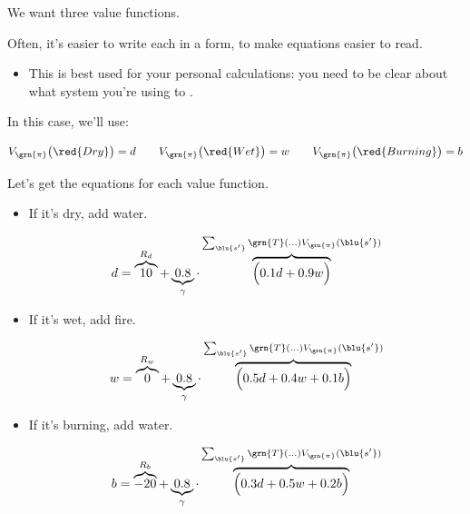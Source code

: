         We want three value functions.\\

        \begin{notation}
            Often, it's easier to write each  in a  form, to make equations easier to read.

            \begin{itemize}
                \item This is best used for your personal calculations: you need to be clear about what system you're using to .
            \end{itemize}

            In this case, we'll use:

            \begin{equation*}
                V_{\grn{\pi}}\big(\red{Dry}\big) = d 
                \qquad
                V_{\grn{\pi}}\big(\red{Wet}\big) = w
                \qquad
                V_{\grn{\pi}}\big(\red{Burning}\big) = b
            \end{equation*}
        \end{notation}

        Let's get the equations for each value function.

        \begin{itemize}
            \item If it's dry, add water.
        

        \begin{equation}
            d = 
            \overbrace{10}^{R_d} + 
            \underbrace{0.8}_{\gamma} \cdot 
            \overbrace{
            \Big(
                0.1 d + 
                0.9 w
            \Big)
            }^{\sum_{\blu{s'}}  
                \grn{T}(...)
                V_{\grn{\pi}}(\blu{s'} )}
        \end{equation}
        
        \item If it's wet, add fire.
        
        \begin{equation}
            w = 
            \overbrace{0}^{R_w} + 
            \underbrace{0.8}_{\gamma} \cdot 
            \overbrace{
            \Big(
                0.5d + 0.4w + 0.1b
            \Big)
            }^{\sum_{\blu{s'}}  
                \grn{T}(...)
                V_{\grn{\pi}}(\blu{s'} )}
        \end{equation}

        \item If it's burning, add water.

        \begin{equation}
            b = 
            \overbrace{-20}^{R_b} + 
            \underbrace{0.8}_{\gamma} \cdot 
            \overbrace{
            \Big(
                0.3d+0.5w+0.2b
            \Big)
            }^{\sum_{\blu{s'}}  
                \grn{T}(...)
                V_{\grn{\pi}}(\blu{s'} )}
        \end{equation}

        \end{itemize}

